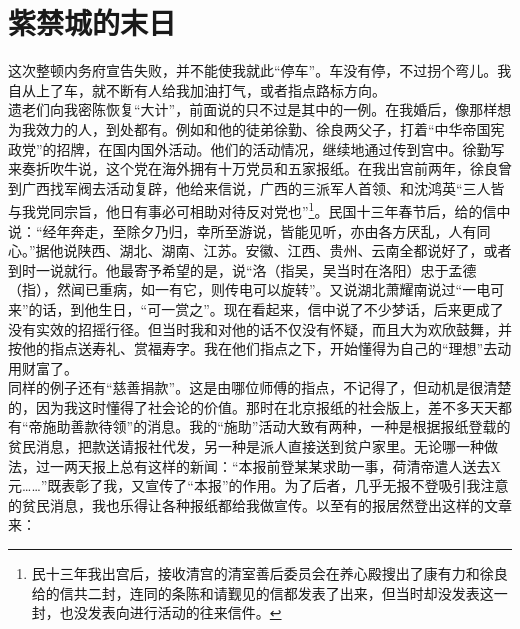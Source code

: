 \fancyhead[RO]{} %
\fancyhead[LE]{} %
\chapter*{紫禁城的末日}
\thispagestyle{empty}
这次整顿内务府宣告失败，并不能使我就此“停车”。车没有停，不过拐个弯儿。我自从上了车，就不断有人给我加油打气，或者指点路标方向。\\

遗老们向我密陈恢复“大计”，前面说的只不过是其中的一例。在我婚后，像那样想为我效力的人，到处都有。例如和他的徒弟徐勤、徐良两父子，打着“中华帝国宪政党”的招牌，在国内国外活动。他们的活动情况，继续地通过传到宫中。徐勤写来奏折吹牛说，这个党在海外拥有十万党员和五家报纸。在我出宫前两年，徐良曾到广西找军阀去活动复辟，他给来信说，广西的三派军人首领、和沈鸿英“三人皆与我党同宗旨，他日有事必可相助对待反对党也”\footnote{民十三年我出宫后，接收清宫的清室善后委员会在养心殿搜出了康有力和徐良给的信共二封，连同的条陈和请觐见的信都发表了出来，但当时却没发表这一封，也没发表向进行活动的往来信件。}。民国十三年春节后，给的信中说：“经年奔走，至除夕乃归，幸所至游说，皆能见听，亦由各方厌乱，人有同心。”据他说陕西、湖北、湖南、江苏。安徽、江西、贵州、云南全都说好了，或者到时一说就行。他最寄予希望的是，说“洛（指吴，吴当时在洛阳）忠于孟德（指），然闻已重病，如一有它，则传电可以旋转”。又说湖北萧耀南说过“一电可来”的话，到他生日，“可一赏之”。现在看起来，信中说了不少梦话，后来更成了没有实效的招摇行径。但当时我和对他的话不仅没有怀疑，而且大为欢欣鼓舞，并按他的指点送寿礼、赏福寿字。我在他们指点之下，开始懂得为自己的“理想”去动用财富了。\\


同样的例子还有“慈善捐款”。这是由哪位师傅的指点，不记得了，但动机是很清楚的，因为我这时懂得了社会论的价值。那时在北京报纸的社会版上，差不多天天都有“帝施助善款待领”的消息。我的“施助”活动大致有两种，一种是根据报纸登载的贫民消息，把款送请报社代发，另一种是派人直接送到贫户家里。无论哪一种做法，过一两天报上总有这样的新闻：“本报前登某某求助一事，荷清帝遣人送去X元……”既表彰了我，又宣传了“本报”的作用。为了后者，几乎无报不登吸引我注意的贫民消息，我也乐得让各种报纸都给我做宣传。以至有的报居然登出这样的文章来：\\

